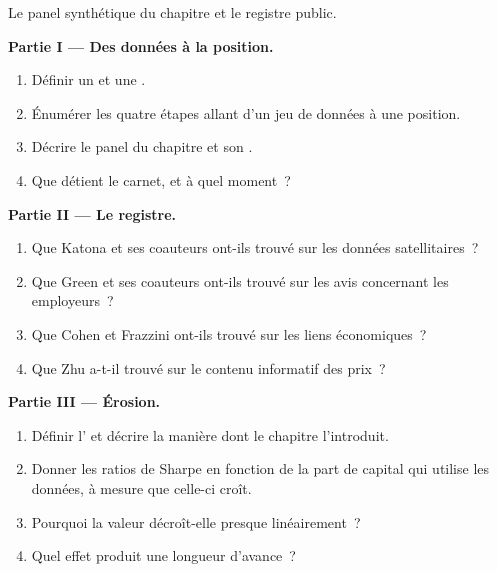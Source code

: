 \begin{problem}\label{pb:s1:alternative-data-strategies:1}
Le panel synthétique du chapitre et le registre public.

\medskip\noindent\textbf{Partie I --- Des données à la position.}
\begin{enumerate}
\item Définir un  et une .
\item Énumérer les quatre étapes allant d'un jeu de données à une position.
\item Décrire le panel du chapitre et son .
\item Que détient le carnet, et à quel moment~?
\end{enumerate}

\medskip\noindent\textbf{Partie II --- Le registre.}
\begin{enumerate}[resume]
\item Que Katona et ses coauteurs ont-ils trouvé sur les données satellitaires~?
\item Que Green et ses coauteurs ont-ils trouvé sur les avis concernant les employeurs~?
\item Que Cohen et Frazzini ont-ils trouvé sur les liens économiques~?
\item Que Zhu a-t-il trouvé sur le contenu informatif des prix~?
\end{enumerate}

\medskip\noindent\textbf{Partie III --- Érosion.}
\begin{enumerate}[resume]
\item Définir l' et décrire la manière dont le chapitre l'introduit.
\item Donner les ratios de Sharpe en fonction de la part de capital qui utilise les données, à mesure que celle-ci croît.
\item Pourquoi la valeur décroît-elle presque linéairement~?
\item Quel effet produit une longueur d'avance~?
\end{enumerate}


\end{problem}

